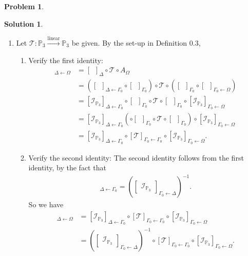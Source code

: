 \documentclass{article}
\theoremstyle{definition}
\newtheorem*{prob*}{Problem}
\newtheorem*{sln*}{Solution}
\newcommand{\lin}{\overset{\text{linear}}{\longrightarrow}}
\newcommand{\T}{\mathcal{T}}
\begin{document}
\begin{prob*}
\begin{sln*}
\begin{enumerate}
			\item Let $\T : \mathbb{P}_3 \lin \mathbb{P}_3$ be given. By the set-up in Definition 0.3,
			\begin{enumerate}
				\item Verify the first identity:
				\begin{align*}
				[\T]_{\Delta\leftarrow \Omega} &= [\,\,\,]_{\Delta}\circ \T\circ A_\Omega\\
				&= \left([\,\,\,]_{\Delta\leftarrow \Gamma_0} \circ [\,\,\,]_{\Gamma_0}\right) \circ \T \circ \left( [\,\,\,]_{\Gamma_0}\circ[\,\,\,]_{\Gamma_0\leftarrow\Omega}\right)\\
				&= [\mathcal{I}_{\mathbb{P}_3}]_{\Delta\leftarrow \Gamma_0} \circ [\,\,\,]_{\Gamma_0} \circ \T \circ  [\,\,\,]_{\Gamma_0}\circ[\mathcal{I}_{\mathbb{P}_3}]_{\Gamma_0\leftarrow\Omega}\\
				&= [\mathcal{I}_{\mathbb{P}_3}]_{\Delta\leftarrow \Gamma_0} \left( \circ [\,\,\,]_{\Gamma_0} \circ \T \circ  [\,\,\,]_{\Gamma_0} \right) \circ[\mathcal{I}_{\mathbb{P}_3}]_{\Gamma_0\leftarrow\Omega}\\
				&= [\mathcal{I}_{\mathbb{P}_3}]_{\Delta\leftarrow \Gamma_0} \circ [\T]_{\Gamma_0 \leftarrow \Gamma_0}\circ [\mathcal{I}_{\mathbb{P}_3}]_{\Gamma_0\leftarrow\Omega}.
				\end{align*}
				
				\item Verify the second identity: The second identity follows from the first identity, by the fact that
				\begin{align*}
				[\mathcal{I}_{\mathbb{P}_3}]_{\Delta\leftarrow \Gamma_0} = \left(\begin{bmatrix}\mathcal{I}_{\mathbb{P}_3}\end{bmatrix}_{\Gamma_0\leftarrow\Delta}\right)^{-1}.
				\end{align*}
				So we have
				\begin{align*}
				[\T]_{\Delta\leftarrow \Omega} &= [\mathcal{I}_{\mathbb{P}_3}]_{\Delta\leftarrow \Gamma_0} \circ [\T]_{\Gamma_0 \leftarrow \Gamma_0}\circ [\mathcal{I}_{\mathbb{P}_3}]_{\Gamma_0\leftarrow\Omega}\\
				&=  \left(\begin{bmatrix}\mathcal{I}_{\mathbb{P}_3}\end{bmatrix}_{\Gamma_0\leftarrow\Delta}\right)^{-1} \circ [\T]_{\Gamma_0 \leftarrow \Gamma_0}\circ [\mathcal{I}_{\mathbb{P}_3}]_{\Gamma_0\leftarrow\Omega}.
				\end{align*}
			\end{enumerate}
		

\end{enumerate}
\end{sln*}
\end{prob*}
\end{document}
